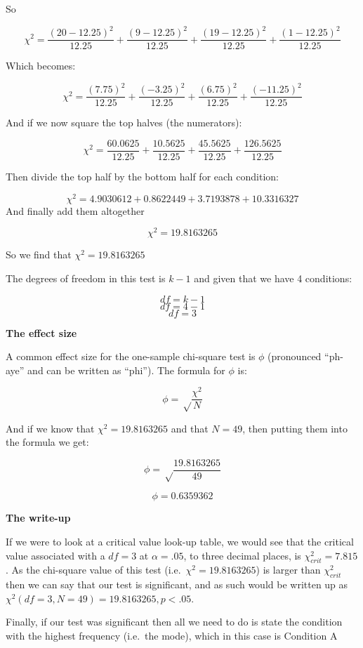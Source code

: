 \documentclass[
  oneside]{book}
\begin{document}
So

\[\chi^2 = \frac{(20 - 12.25)^2}{12.25}+\frac{(9 - 12.25)^2}{12.25}+\frac{(19 - 12.25)^2}{12.25}+\frac{(1 - 12.25)^2}{12.25}\]

Which becomes:

\[\chi^2 = \frac{(7.75)^2}{12.25} + \frac{(-3.25)^2}{12.25} + \frac{(6.75)^2}{12.25} + \frac{(-11.25)^2}{12.25}\]

And if we now square the top halves (the numerators):

\[\chi^2 = \frac{60.0625}{12.25} + \frac{10.5625}{12.25} + \frac{45.5625}{12.25} + \frac{126.5625}{12.25}\]

Then divide the top half by the bottom half for each condition:

\[\chi^2 = {4.9030612}+{0.8622449}+{3.7193878}+{10.3316327}\]
And finally add them altogether

\[\chi^2 = 19.8163265\]

So we find that \(\chi^2 = 19.8163265\)

The degrees of freedom in this test is \(k - 1\) and given that we have 4 conditions:

\[df = k - 1\]
\[df = 4 - 1\]
\[df = 3\]

\textbf{The effect size}

A common effect size for the one-sample chi-square test is \(\phi\) (pronounced ``ph-aye'' and can be written as ``phi''). The formula for \(\phi\) is:

\[\phi = \sqrt\frac{\chi^2}{N}\]

And if we know that \(\chi^2 =19.8163265\) and that \(N = 49\), then putting them into the formula we get:

\[\phi = \sqrt\frac{19.8163265}{49}\]

\[\phi = 0.6359362\]

\textbf{The write-up}

If we were to look at a critical value look-up table, we would see that the critical value associated with a \(df = 3\) at \(\alpha = .05\), to three decimal places, is \(\chi^2_{crit} = 7.815\). As the chi-square value of this test (i.e.~\(\chi^2 = 19.8163265\)) is larger than \(\chi^2_{crit}\) then we can say that our test is significant, and as such would be written up as \(\chi^2(df = 3, N = 49) = 19.8163265,p < .05\).

Finally, if our test was significant then all we need to do is state the condition with the highest frequency (i.e.~the mode), which in this case is Condition A
\end{document}
